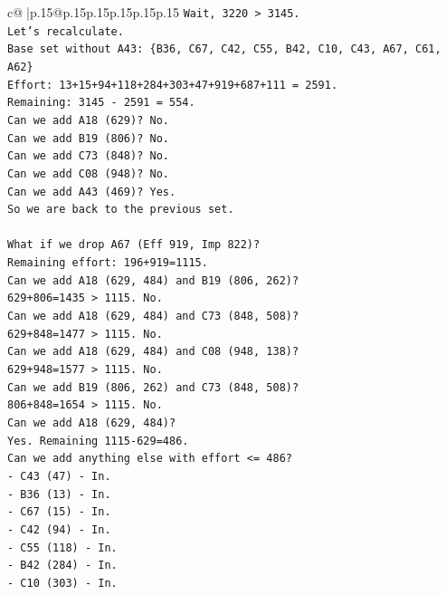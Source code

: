 \documentclass{article}
\begin{document}
{\begin{supertabular}{c@{$\;$}|p{.15\linewidth}@{}p{.15\linewidth}p{.15\linewidth}p{.15\linewidth}p{.15\linewidth}p{.15\linewidth}}
{{{\texttt{Wait, 3220 > 3145.} \\
\texttt{Let's recalculate.} \\
\texttt{Base set without A43: \{B36, C67, C42, C55, B42, C10, C43, A67, C61, A62\}} \\
\texttt{Effort: 13+15+94+118+284+303+47+919+687+111 = 2591.} \\
\texttt{Remaining: 3145 {-} 2591 = 554.} \\
\texttt{Can we add A18 (629)? No.} \\
\texttt{Can we add B19 (806)? No.} \\
\texttt{Can we add C73 (848)? No.} \\
\texttt{Can we add C08 (948)? No.} \\
\texttt{Can we add A43 (469)? Yes.} \\
\texttt{So we are back to the previous set.} \\
\\ 
\texttt{What if we drop A67 (Eff 919, Imp 822)?} \\
\texttt{Remaining effort: 196+919=1115.} \\
\texttt{Can we add A18 (629, 484) and B19 (806, 262)?} \\
\texttt{629+806=1435 > 1115. No.} \\
\texttt{Can we add A18 (629, 484) and C73 (848, 508)?} \\
\texttt{629+848=1477 > 1115. No.} \\
\texttt{Can we add A18 (629, 484) and C08 (948, 138)?} \\
\texttt{629+948=1577 > 1115. No.} \\
\texttt{Can we add B19 (806, 262) and C73 (848, 508)?} \\
\texttt{806+848=1654 > 1115. No.} \\
\texttt{Can we add A18 (629, 484)?} \\
\texttt{Yes. Remaining 1115{-}629=486.} \\
\texttt{Can we add anything else with effort <= 486?} \\
\texttt{{-} C43 (47) {-} In.} \\
\texttt{{-} B36 (13) {-} In.} \\
\texttt{{-} C67 (15) {-} In.} \\
\texttt{{-} C42 (94) {-} In.} \\
\texttt{{-} C55 (118) {-} In.} \\
\texttt{{-} B42 (284) {-} In.} \\
\texttt{{-} C10 (303) {-} In.} \\
}}}
\end{supertabular}}
\end{document}
